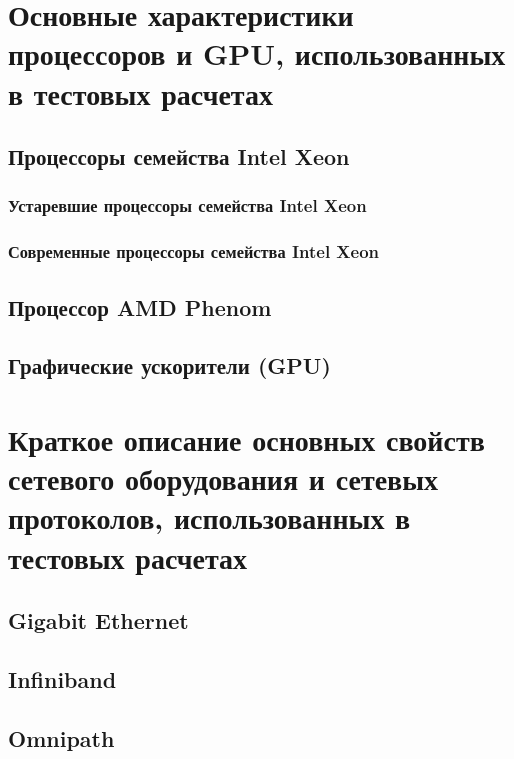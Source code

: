 \chapter{Основные характеристики процессоров и GPU, использованных в тестовых расчетах} \label{AppendixA}

\section{Процессоры семейства Intel Xeon}
\subsection{Устаревшие процессоры семейства Intel Xeon}
\subsection{Современные процессоры семейства Intel Xeon}

\section{Процессор AMD Phenom}

\section{Графические ускорители (GPU)}



\chapter{Краткое описание основных свойств сетевого оборудования и сетевых протоколов, использованных в тестовых расчетах} \label{AppendixB}

\section{Gigabit Ethernet}
\section{Infiniband}
\section{Omnipath}


